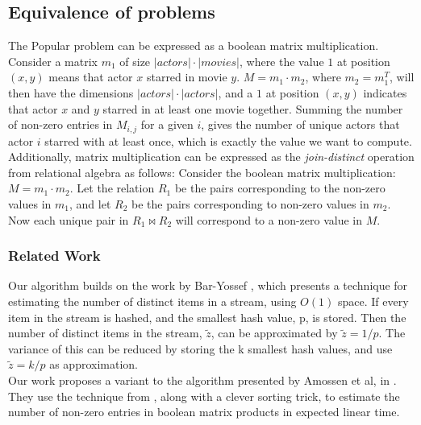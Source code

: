 \documentclass[a4paper,11pt]{article}
\begin{document}
\subsection{Equivalence of problems}
The Popular problem can be expressed as a boolean matrix multiplication. Consider a matrix $m_1$ of size $|actors| \cdot |movies|$, where the value $1$ at position $(x, y)$ means that actor $x$ starred in movie $y$. $M = m_1 \cdot m_2$, where $m_2 = m_1^T$, will then have the dimensions $|actors| \cdot |actors|$, and a $1$ at position $(x, y)$ indicates that actor $x$ and $y$ starred in at least one movie together. Summing the number of non-zero entries in $M_{i,j}$ for a given $i$, gives the number of unique actors that actor $i$ starred with at least once, which is exactly the value we want to compute.\\
Additionally, matrix multiplication can be expressed as the \emph{join-distinct} operation from relational algebra as follows: Consider the boolean matrix multiplication: $M = m_1 \cdot m_2$. Let the relation $R_1$ be the pairs corresponding to the non-zero values in $m_1$, and let $R_2$ be the pairs corresponding to non-zero values in $m_2$. Now each unique pair in $R_1 \Join R_2$ will correspond to a non-zero value in $M$.

\subsubsection{Related Work}
Our algorithm builds on the work by Bar-Yossef \cite{paper:bar-yos}, which presents a technique for estimating the number of distinct items in a stream, using $O(1)$ space. If every item in the stream is hashed, and the smallest hash value, p, is stored. Then the number of distinct items in the stream, $\tilde{z}$, can be approximated by $\tilde{z}=1/p$. The variance of this can be reduced by storing the k smallest hash values, and use $\tilde{z}=k/p$ as approximation.\\

Our work proposes a variant to the algorithm presented by Amossen et al, in \cite{paper:amossen}. They use the technique from \cite{paper:bar-yos}, along with a clever sorting trick, to estimate the number of non-zero entries in boolean matrix products in expected linear time. 

\end{document}
